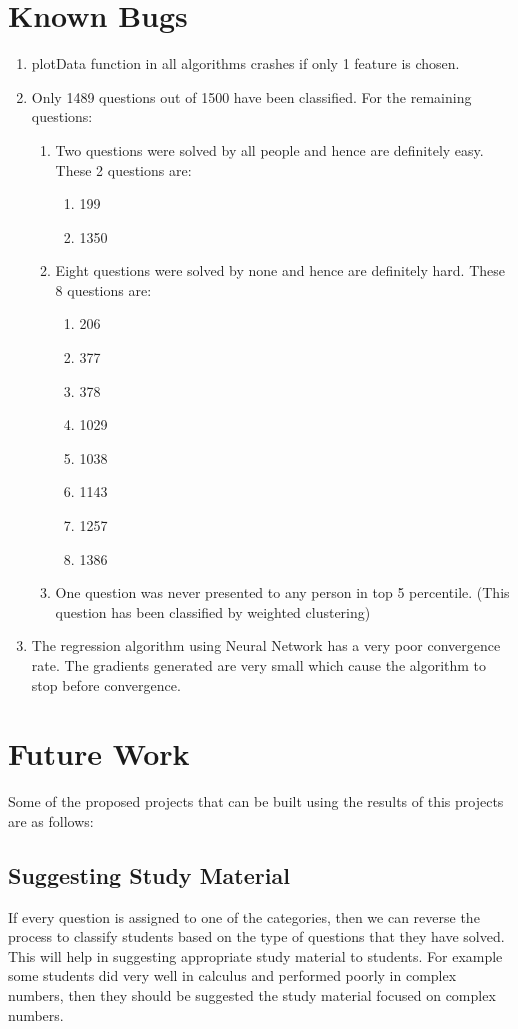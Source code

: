 \documentclass[12pt]{article}
\begin{document}
	\section{Known Bugs}
	\begin{enumerate}
		\item plotData function in all algorithms crashes if only 1 feature is chosen.
		\item Only 1489 questions out of 1500 have been classified. For the remaining questions:
		\begin{enumerate}
			\item Two questions were solved by all people and hence are definitely easy.
			These 2 questions are:
			\begin{enumerate}
				\item 199
				\item 1350
			\end{enumerate}
			\item Eight questions were solved by none and hence are definitely hard.
			These 8 questions are:
			\begin{enumerate}
				\item 206
				\item 377
				\item 378
				\item 1029
				\item 1038
				\item 1143
				\item 1257
				\item 1386
			\end{enumerate}
			\item One question was never presented to any person in top 5 percentile.
			(This question has been classified by weighted clustering) 
		\end{enumerate}
		\item The regression algorithm using Neural Network has a very poor
		convergence rate. The gradients generated are very small which cause
		the algorithm to stop before convergence.
	\end{enumerate}
	
	
	\section{Future Work}
	Some of the proposed projects that can be built using the results of
	this projects are as follows:
	
	\subsection{Suggesting Study Material}
	If every question is assigned to one of the categories, then
	we can reverse the process to classify students based on the type
	of questions that they have solved. This will help in suggesting 
	appropriate study material to students. For example some students
	did very well in calculus and performed poorly in complex numbers,
	then they should be suggested the study material focused on complex
	numbers.
	
\end{document}
